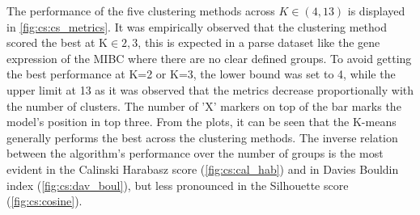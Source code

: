 The performance of the five clustering methods across $K\in(4, 13)$ is displayed in
\cref{fig:cs:cs_metrics}. It was empirically observed that the clustering method scored the best at K$\in{2,3}$, this is expected in a parse dataset like the gene expression of the MIBC where there are no clear defined groups. To avoid getting the best performance at K=2 or K=3, the lower bound was set to 4, while the upper limit at 13 as it was observed that the metrics decrease proportionally with the number of clusters. The number of 'X' markers on top of the bar marks the model's position in top three. From the plots, it can be seen that the K-means generally performs the best across the clustering methods. The inverse relation between the algorithm's performance over the number of groups is the most evident in the Calinski Harabasz score (\cref{fig:cs:cal_hab}) and in Davies Bouldin index (\cref{fig:cs:dav_boul}), but less pronounced in the Silhouette score (\cref{fig:cs:cosine}).


